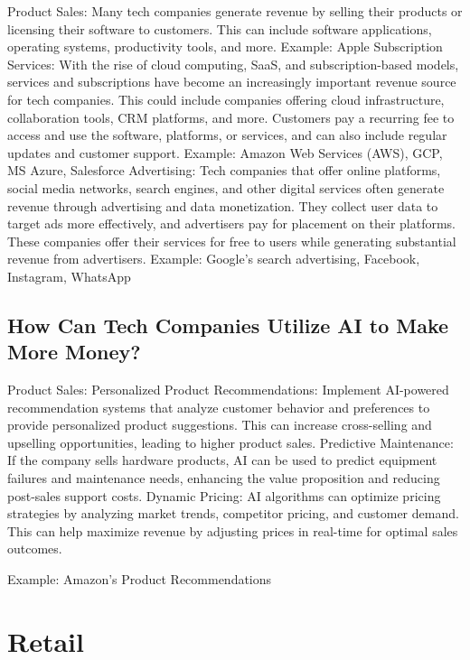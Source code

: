 \documentclass[
]{article}
\begin{document}
Product Sales: Many tech companies generate revenue by selling their products or licensing their software to customers. This can include software applications, operating systems, productivity tools, and more.
Example: Apple
Subscription Services: With the rise of cloud computing, SaaS, and subscription-based models, services and subscriptions have become an increasingly important revenue source for tech companies. This could include companies offering cloud infrastructure, collaboration tools, CRM platforms, and more. Customers pay a recurring fee to access and use the software, platforms, or services, and can also include regular updates and customer support.
Example: Amazon Web Services (AWS), GCP, MS Azure, Salesforce
Advertising: Tech companies that offer online platforms, social media networks, search engines, and other digital services often generate revenue through advertising and data monetization. They collect user data to target ads more effectively, and advertisers pay for placement on their platforms. These companies offer their services for free to users while generating substantial revenue from advertisers.
Example: Google's search advertising, Facebook, Instagram, WhatsApp

\hypertarget{how-can-tech-companies-utilize-ai-to-make-more-money}{%
\subsection{How Can Tech Companies Utilize AI to Make More Money?}\label{how-can-tech-companies-utilize-ai-to-make-more-money}}

Product Sales:
Personalized Product Recommendations: Implement AI-powered recommendation systems that analyze customer behavior and preferences to provide personalized product suggestions. This can increase cross-selling and upselling opportunities, leading to higher product sales.
Predictive Maintenance: If the company sells hardware products, AI can be used to predict equipment failures and maintenance needs, enhancing the value proposition and reducing post-sales support costs.
Dynamic Pricing: AI algorithms can optimize pricing strategies by analyzing market trends, competitor pricing, and customer demand. This can help maximize revenue by adjusting prices in real-time for optimal sales outcomes.

Example: Amazon's Product Recommendations

\hypertarget{retail}{%
\section{Retail}\label{retail}}
\end{document}
